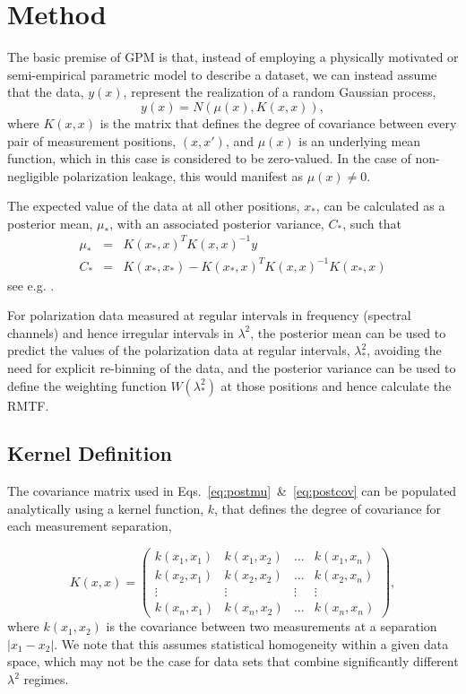 \documentclass[fleqn,usenatbib]{mnras}
\begin{document}
\section{Method}
\label{sec:method}

The basic premise of GPM is that, instead of employing a physically motivated or semi-empirical parametric model to describe a dataset, we can instead assume that the data, $y(x)$, represent the realization of a random Gaussian process,
%
\begin{equation}
y(x) = N(\mu(x), K(x,x)),
\end{equation}
%
where $K(x,x)$ is the matrix that defines the degree of covariance between every pair of measurement positions, $(x,x')$, and $\mu(x)$ is an underlying mean function, which in this case is considered to be zero-valued. In the case of non-negligible polarization leakage, this would manifest as $\mu(x)\neq 0$.

The expected value of the data at all other positions, $x_{\ast}$, can be calculated as a posterior mean, $\mu_{\ast}$, with an associated posterior variance, $C_{\ast}$, such that
%
\begin{eqnarray}
\label{eq:postmu} \mu_{\ast} &=&  K(x_{\ast},x)^T K(x,x)^{-1} y  \\
\label{eq:postcov} C_{\ast} &=&  K(x_{\ast},x_{\ast}) - K(x_{\ast},x)^T K(x,x)^{-1} K(x_{\ast},x)
\end{eqnarray}
%
see e.g. \cite{3569, article}.

For polarization data measured at regular intervals in frequency (spectral channels) and hence irregular intervals in $\lambda^2$, the posterior mean can be used to predict the values of the polarization data at regular intervals, $\lambda_{\ast}^2$, avoiding the need for explicit re-binning of the data, and the posterior variance can be used to define the weighting function $W(\lambda_{\ast}^2)$ at those positions and hence calculate the RMTF.

\subsection{Kernel Definition}

The covariance matrix used in Eqs.~\ref{eq:postmu}~\&~\ref{eq:postcov} can be populated analytically using a kernel function, $k$, that defines the degree of covariance for each measurement separation,

\begin{equation}
K(x,x) = \left(
\begin{array}{cccc}
k(x_1,x_1) & k(x_1,x_2) & ... & k(x_1,x_n) \\
k(x_2,x_1) & k(x_2,x_2) & ... & k(x_2,x_n) \\
\vdots & \vdots & \vdots & \vdots \\
k(x_n,x_1) & k(x_n,x_2) & ... & k(x_n,x_n)
\end{array}
\right),
\end{equation}
%
where $k(x_1,x_2)$ is the covariance between two measurements at a separation $|x_1 - x_2|$. We note that this assumes statistical homogeneity within a given data space, which may not be the case for data sets that combine significantly different $\lambda^2$ regimes.
\end{document}

